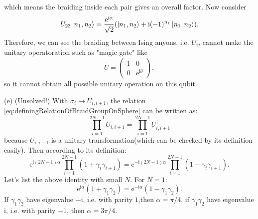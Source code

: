 \documentclass{book}
\begin{document}
which means the braiding inside each pair gives an overall factor. Now consider
\begin{equation*}
U_{23}\ket{n_{1} ,n_{2}} =\frac{\mathrm{e}^{\mathrm{i} \alpha }}{\sqrt{2}} (\ket{n_{1} ,n_{2}} +\mathrm{i}( -1)^{n_{1}}\ket{n_{1} ,n_{2}} ).
\end{equation*}
Therefore, we can see the braiding between Ising anyons, i.e. $U_{ij}$ cannot make the unitary operatoration such as "magic gate" like
\begin{equation*}
U=\begin{pmatrix}
1 & 0\\
0 & \mathrm{e}^{\mathrm{i} \theta }
\end{pmatrix} ,
\end{equation*}
so it cannot obtain all possible unitary operation on this qubit. 



(e) (Unsolved!) With $\sigma _{i} \mapsto U_{i,i+1}$, the relation \eqref{eq:definingRelationOfBraidGroupOnSphere} can be written as:
\begin{equation*}
\prod _{i=1}^{2N-1} U_{i,i+1} =\prod _{i=1}^{2N-1} U_{i,i+1}^{\dagger }
\end{equation*}
because $U_{i,i+1}$ is a unitary transformation(which can be checked by its definition easily). Then according to its definition:
\begin{equation*}
\mathrm{e}^{\mathrm{i}( 2N-1) \alpha }\prod _{i=1}^{2N-1}( 1+\gamma _{i} \gamma _{i+1}) =\mathrm{e}^{-\mathrm{i}( 2N-1) \alpha }\prod _{i=1}^{2N-1}( 1-\gamma _{i} \gamma _{i+1}) .
\end{equation*}
Let's list the above identity with small $N$. For $N=1$:
\begin{equation*}
\mathrm{e}^{\mathrm{i} \alpha }( 1+\gamma _{1} \gamma _{2}) =\mathrm{e}^{-\mathrm{i} \alpha }( 1-\gamma _{1} \gamma _{2}) .
\end{equation*}
If $\gamma _{1} \gamma _{2}$ have eigenvalue $-\mathrm{i}$, i.e. with parity $1$,then $\alpha =\pi /4$, if $\gamma _{1} \gamma _{2}$ have eigenvalue $\mathrm{i}$, i.e. with parity $-1$, then $\alpha =3\pi /4$.
\end{document}
